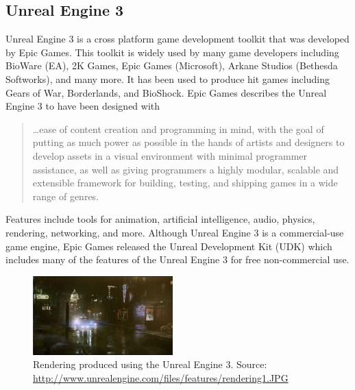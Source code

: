 \subsection{Unreal Engine 3}
Unreal Engine 3 is a cross platform game development toolkit that was developed by Epic Games. This toolkit is widely used by many game developers including BioWare (EA), 2K Games, Epic Games (Microsoft), Arkane Studios (Bethesda Softworks), and many more. It has been used to produce hit games including Gears of War, Borderlands, and BioShock. Epic Games describes the Unreal Engine 3 to have been designed with

\begin{quote}
\ldots ease of content creation and programming in mind, with the goal of putting as much power as possible in the hands of artists and designers to develop assets in a visual environment with minimal programmer assistance, as well as giving programmers a highly modular, scalable and extensible framework for building, testing, and shipping games in a wide range of genres. \cite{unreal_engine_3}
\end{quote}

Features include tools for animation, artificial intelligence, audio, physics, rendering, networking, and more. Although Unreal Engine 3 is a commercial-use game engine, Epic Games released the Unreal Development Kit (UDK) which includes many of the features of the Unreal Engine 3 for free non-commercial use.

\begin{figure}[!ht]
  \centering \includegraphics[width=0.48\textwidth]{Images/unreal_engine3_rendering.jpg}
	\caption{Rendering produced using the Unreal Engine 3. Source: \url{http://www.unrealengine.com/files/features/rendering1.JPG}}
\end{figure}


